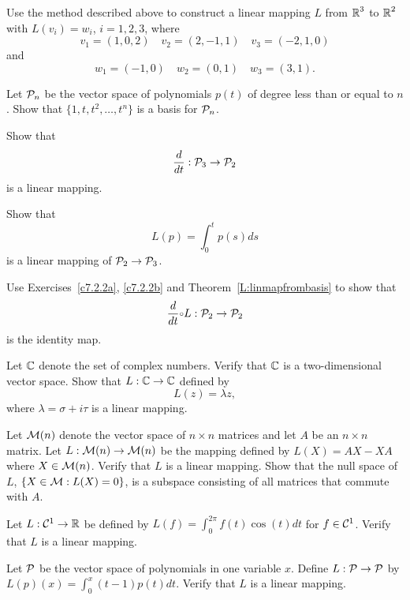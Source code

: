 \documentclass{ximera}
\begin{document}
\EXER

\TEXER

\begin{exercise} \label{c7.2.1}
Use the method described above to construct a linear mapping $L$
from $\mbox{$\Bbb{R}$}^3$ to $\mbox{$\Bbb{R}$}^2$ with $L(v_i)=w_i$, $i=1,2,3$, where
\[
v_1=(1,0,2)\quad v_2=(2,-1,1) \quad v_3=(-2,1,0)
\]
and
\[
w_1=(-1,0) \quad w_2=(0,1) \quad w_3=(3,1).
\]
\end{exercise}

\begin{exercise}  \label{c7.2.2}
Let ${\cal P}_n$ be the vector space of polynomials $p(t)$ of
degree less than or equal to $n$.  Show that $\{1,t,t^2,\ldots,t^n\}$ is a
basis for ${\cal P}_n$.
\end{exercise}

\begin{exercise}  \label{c7.2.2a}
Show that
\[
\frac{d}{dt}:{\cal P}_3\to{\cal P}_2
\]
is a linear mapping.
\end{exercise}
\begin{exercise}  \label{c7.2.2b}
Show that
\[
L(p) = \int_0^tp(s)ds
\]
is a linear mapping of ${\cal P}_2\to{\cal P}_3$.
\end{exercise}
\begin{exercise}  \label{c7.2.2c}
Use Exercises~\ref{c7.2.2a}, \ref{c7.2.2b} and
Theorem~\ref{L:linmapfrombasis} to show that
\[
\frac{d}{dt}\compose L:{\cal P}_2\to{\cal P}_2
\]
is the identity map.
\end{exercise}

\begin{exercise} \label{c7.2.3}
Let $\mbox{$\Bbb{C}$}$ denote the set of complex numbers.  Verify that
$\mbox{$\Bbb{C}$}$ is a two-dimensional vector space.  Show that $L:\mbox{$\Bbb{C}$}\to\mbox{$\Bbb{C}$}$
defined by
\[
L(z) = \lambda z,
\]
where $\lambda=\sigma+i\tau$ is a linear mapping.
\end{exercise}

\begin{exercise} \label{c7.2.4}
Let ${\cal M}(n)$ denote the vector space of $n\times n$
matrices and let $A$ be an $n\times n$ matrix.  Let
$L:{\cal M}(n)\to{\cal M}(n)$ be the mapping defined by
$L(X)=AX-XA$ where $X\in{\cal M}(n)$.  Verify that $L$ is
a linear mapping.  Show that the null space of $L$,
$\{X\in{\cal M}:L(X)=0\}$, is a subspace consisting of all
matrices that commute with $A$.
\end{exercise}

\begin{exercise} \label{c7.2.5}
Let $L:{\cal C}^1\to\mbox{$\Bbb{R}$}$ be defined by $L(f) = \int_0^{2\pi}f(t)\cos(t)dt$
for $f\in{\cal C}^1$.  Verify that $L$ is a linear mapping.
\end{exercise}

\begin{exercise} \label{c7.2.6}
Let ${\cal P}$ be the vector space of polynomials in one variable
$x$.  Define $L:{\cal P}\to {\cal P}$ by $L(p)(x)=\int_0^x(t-1)p(t)dt$.
Verify that $L$ is a linear mapping.
\end{exercise}
\end{document}
